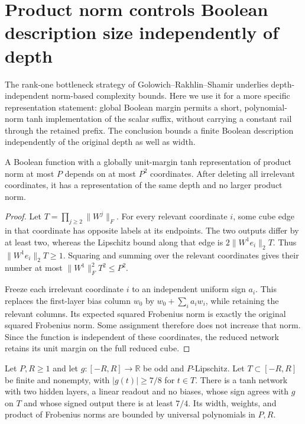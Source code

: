 \section{Product norm controls Boolean description size independently of depth}
\label{sec:boolean-product-depth-saturation}

The rank-one bottleneck strategy of Golowich--Rakhlin--Shamir
\cite{golowich2018} underlies depth-independent norm-based complexity
bounds. Here we use it for a more specific representation statement:
global Boolean margin permits a short, polynomial-norm tanh
implementation of the scalar suffix, without carrying a constant rail
through the retained prefix. The conclusion bounds a finite Boolean
description independently of the original depth as well as width.

\begin{lemma}
\label{lem:pf-junta-freezing}
A Boolean function with a globally unit-margin tanh representation
of product norm at most $P$ depends on at most $P^2$ coordinates.
After deleting all irrelevant coordinates, it has a representation
of the same depth and no larger product norm.
\end{lemma}

\begin{proof}
Let $T=\prod_{j\ge2}\|W^j\|_F$. For every relevant coordinate $i$,
some cube edge in that coordinate has opposite labels at its endpoints.
The two outputs differ by at least two, whereas the Lipschitz bound
along that edge is $2\|W^1e_i\|_2T$. Thus
$\|W^1e_i\|_2T\ge1$. Squaring and summing over the relevant coordinates
gives their number at most $\|W^1\|_F^2T^2\le P^2$.

Freeze each irrelevant coordinate $i$ to an independent uniform sign
$a_i$. This replaces the first-layer bias column $w_0$ by
$w_0+\sum_i a_iw_i$, while retaining the relevant columns. Its expected
squared Frobenius norm is exactly the original squared Frobenius norm.
Some assignment therefore does not increase that norm. Since the
function is independent of these coordinates, the reduced network
retains its unit margin on the full reduced cube.
\end{proof}

\begin{lemma}
\label{lem:odd-scalar-classifier}
Let $P,R\ge1$ and let $g:[-R,R]\to\mathbb R$ be odd and $P$-Lipschitz.
Let $T\subset[-R,R]$ be finite and nonempty, with
$|g(t)|\ge7/8$ for $t\in T$. There is a tanh network with two hidden
layers, a linear readout and no biases, whose sign agrees with $g$
on $T$ and whose signed output there is at least $7/4$.
Its width, weights, and product of Frobenius norms are bounded by
universal polynomials in $P,R$.
\end{lemma}

